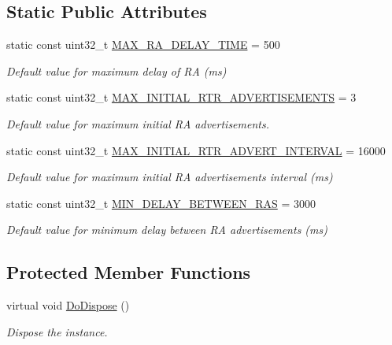 \subsection*{Static Public Attributes}
\begin{DoxyCompactItemize}
\item 
static const uint32\+\_\+t \hyperlink{classns3_1_1Radvd_a941069848477f9c31c5e0a4e961d2653}{M\+A\+X\+\_\+\+R\+A\+\_\+\+D\+E\+L\+A\+Y\+\_\+\+T\+I\+ME} = 500
\begin{DoxyCompactList}\small\item\em Default value for maximum delay of RA (ms) \end{DoxyCompactList}\item 
static const uint32\+\_\+t \hyperlink{classns3_1_1Radvd_a677f90073078cbd6ea55700eb50fcf69}{M\+A\+X\+\_\+\+I\+N\+I\+T\+I\+A\+L\+\_\+\+R\+T\+R\+\_\+\+A\+D\+V\+E\+R\+T\+I\+S\+E\+M\+E\+N\+TS} = 3
\begin{DoxyCompactList}\small\item\em Default value for maximum initial RA advertisements. \end{DoxyCompactList}\item 
static const uint32\+\_\+t \hyperlink{classns3_1_1Radvd_a979a7d57148504114a2a9ca015e9ebc0}{M\+A\+X\+\_\+\+I\+N\+I\+T\+I\+A\+L\+\_\+\+R\+T\+R\+\_\+\+A\+D\+V\+E\+R\+T\+\_\+\+I\+N\+T\+E\+R\+V\+AL} = 16000
\begin{DoxyCompactList}\small\item\em Default value for maximum initial RA advertisements interval (ms) \end{DoxyCompactList}\item 
static const uint32\+\_\+t \hyperlink{classns3_1_1Radvd_a9a4a728aa868bc0e5b5cf692fa235642}{M\+I\+N\+\_\+\+D\+E\+L\+A\+Y\+\_\+\+B\+E\+T\+W\+E\+E\+N\+\_\+\+R\+AS} = 3000
\begin{DoxyCompactList}\small\item\em Default value for minimum delay between RA advertisements (ms) \end{DoxyCompactList}\end{DoxyCompactItemize}
\subsection*{Protected Member Functions}
\begin{DoxyCompactItemize}
\item 
virtual void \hyperlink{classns3_1_1Radvd_aeeb3bca9545ac42f2795fa9c047319f4}{Do\+Dispose} ()
\begin{DoxyCompactList}\small\item\em Dispose the instance. \end{DoxyCompactList}\end{DoxyCompactItemize}
